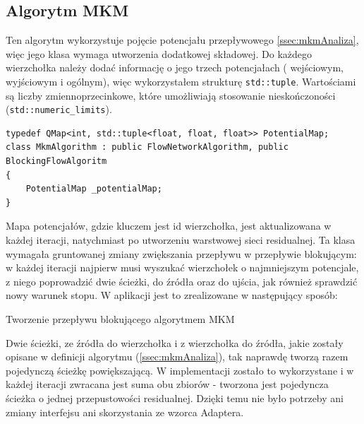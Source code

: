 \subsection{Algorytm MKM}
Ten algorytm wykorzystuje pojęcie potencjału przepływowego \ref{ssec:mkmAnaliza}, więc jego klasa wymaga utworzenia dodatkowej składowej. Do każdego wierzchołka należy dodać informację o jego trzech potencjałach ( wejściowym, wyjściowym i ogólnym), więc wykorzystałem strukturę \lstinline|std::tuple|. Wartościami są liczby zmiennoprzecinkowe, które umożliwiają stosowanie nieskończoności (\lstinline|std::numeric_limits|).
\begin{verbatim}
typedef QMap<int, std::tuple<float, float, float>> PotentialMap;
class MkmAlgorithm : public FlowNetworkAlgorithm, public BlockingFlowAlgoritm
{
	PotentialMap _potentialMap;
}
\end{verbatim}
Mapa potencjałów, gdzie kluczem jest id wierzchołka, jest aktualizowana w każdej iteracji, natychmiast po utworzeniu warstwowej sieci residualnej. Ta klasa wymagała gruntowanej zmiany zwiększania przepływu w przepływie blokującym: w każdej iteracji najpierw musi wyszukać wierzchołek o najmniejszym potencjale, z niego poprowadzić dwie ścieżki, do źródła oraz do ujścia, jak również sprawdzić nowy warunek stopu. W aplikacji jest to zrealizowane w następujący sposób:
\begin{algorithm}[H]
	\caption{Tworzenie przepływu blokującego algorytmem MKM}\label{mkmZwiekszeniePrzeplywuAlg}
	\begin{algorithmic}
		\Repeat
			\EndIf
			\Else
			\EndIf
		\EndProcedure
	\end{algorithmic}
\end{algorithm}
Dwie ścieżki, ze źródła do wierzchołka i z wierzchołka do źródła, jakie zostały opisane w definicji algorytmu (\ref{ssec:mkmAnaliza}), tak naprawdę tworzą razem pojedynczą ścieżkę powiększającą. W implementacji zostało to wykorzystane i w każdej iteracji zwracana jest suma obu zbiorów - tworzona jest pojedyncza ścieżka o jednej przepustowości residualnej. Dzięki temu nie było potrzeby ani zmiany interfejsu ani skorzystania ze wzorca Adaptera.\\\indent
